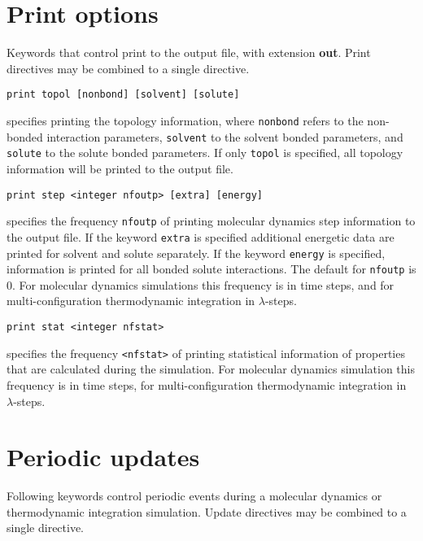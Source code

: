 \section{Print options}
Keywords that control print to the output file, with extension {\bf out}.
Print directives may be combined to a single directive.

\begin{description}

\item
\begin{verbatim}
print topol [nonbond] [solvent] [solute]
\end{verbatim}
specifies printing the topology information,
where {\tt nonbond} refers to the non-bonded interaction parameters,
{\tt solvent} to the solvent bonded parameters, and {\tt solute} to the
solute bonded parameters. If only {\tt topol} is specified, all
topology information will be printed to the output file.

\item
\begin{verbatim}
print step <integer nfoutp> [extra] [energy]
\end{verbatim}
specifies the frequency \verb+nfoutp+ of printing molecular dynamics step
information to the output file. If the keyword {\tt extra} is specified
additional energetic data are printed for solvent and solute separately.
If the keyword {\tt energy} is specified, information is printed for
all bonded solute interactions.
The default for \verb+nfoutp+ is 0. For molecular dynamics simulations
this frequency is in time steps, and for multi-configuration thermodynamic
integration in $\lambda$-steps.

\item
\begin{verbatim}
print stat <integer nfstat>
\end{verbatim}
specifies the frequency \verb+<nfstat>+ of printing statistical information
of properties that are calculated during the simulation. 
For molecular dynamics simulation
this frequency is in time steps, for multi-configuration thermodynamic
integration in $\lambda$-steps.
\end{description}

\section{Periodic updates}
Following keywords control periodic events during a molecular
dynamics or thermodynamic integration simulation.
Update directives may be combined to a single directive.

